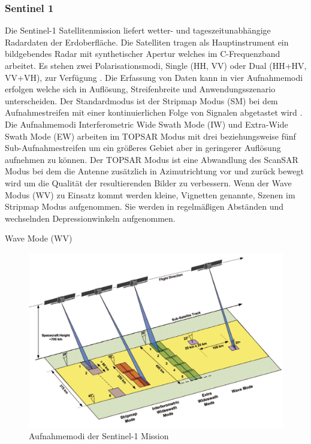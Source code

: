 \subsubsection{Sentinel 1}
Die Sentinel-1 Satellitenmission liefert wetter- und tageszeitunabhängige Radardaten der Erdoberfläche. Die Satelliten tragen als Hauptinstrument ein 
bildgebendes Radar mit synthetischer Apertur welches im C-Frequenzband arbeitet. Es stehen zwei Polarisationsmodi, Single (HH, VV) oder Dual (HH+HV, VV+VH),
zur Verfügung \cite{sentinel_1_definition}. 
Die Erfassung von Daten kann in vier Aufnahmemodi erfolgen welche sich in Auflösung, Streifenbreite und Anwendungsszenario unterscheiden. 
Der Standardmodus ist der Stripmap Modus (SM) bei dem Aufnahmestreifen mit einer kontinuierlichen Folge von Signalen abgetastet wird \cite{sentinel_1_definition}.
Die Aufnahmemodi Interferometric Wide Swath Mode (IW) und Extra-Wide Swath Mode (EW) arbeiten im TOPSAR Modus mit drei beziehungsweise
fünf Sub-Aufnahmestreifen um ein größeres Gebiet aber in geringerer Auflösung aufnehmen zu können. Der TOPSAR Modus ist eine Abwandlung des ScanSAR Modus bei 
dem die Antenne zusätzlich in Azimutrichtung vor und zurück bewegt wird um die Qualität der resultierenden Bilder zu verbessern. 
Wenn der Wave Modus (WV) zu Einsatz kommt werden kleine, Vignetten genannte, Szenen im Stripmap Modus aufgenommen. Sie werden in regelmäßigen Abständen und
wechselnden Depressionwinkeln aufgenommen.   

Wave Mode (WV)\\


\begin{figure}[H]
    \centering
    \includegraphics[width=16cm]{Bilder/Aquisition_Modes.png}
    \caption{Aufnahmemodi der Sentinel-1 Mission \cite{sentinel_1_overview}}
    \label{fig:aquisition_modes}
\end{figure}

